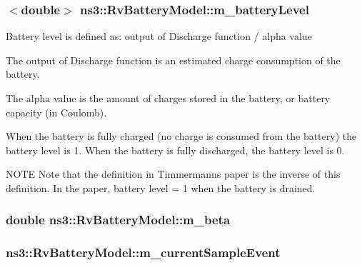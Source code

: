 \subsubsection[{\texorpdfstring{m\+\_\+battery\+Level}{m_batteryLevel}}]{$<$double$>$ ns3\+::\+Rv\+Battery\+Model\+::m\+\_\+battery\+Level\hspace{0.3cm}{\ttfamily [private]}}\hypertarget{classns3_1_1RvBatteryModel_af8c48353c513a2279115e52927b479a0}{}\label{classns3_1_1RvBatteryModel_af8c48353c513a2279115e52927b479a0}
Battery level is defined as\+: output of Discharge function / alpha value

The output of Discharge function is an estimated charge consumption of the battery.

The alpha value is the amount of charges stored in the battery, or battery capacity (in Coulomb).

When the battery is fully charged (no charge is consumed from the battery) the battery level is 1. When the battery is fully discharged, the battery level is 0.

N\+O\+TE Note that the definition in Timmermann\textquotesingle{}s paper is the inverse of this definition. In the paper, battery level = 1 when the battery is drained. 
\subsubsection[{\texorpdfstring{m\+\_\+beta}{m_beta}}]{\setlength{\rightskip}{0pt plus 5cm}double ns3\+::\+Rv\+Battery\+Model\+::m\+\_\+beta\hspace{0.3cm}{\ttfamily [private]}}\hypertarget{classns3_1_1RvBatteryModel_afd9fb778ecbaf556b125e4a557baba86}{}\label{classns3_1_1RvBatteryModel_afd9fb778ecbaf556b125e4a557baba86}
\subsubsection[{\texorpdfstring{m\+\_\+current\+Sample\+Event}{m_currentSampleEvent}}]{ ns3\+::\+Rv\+Battery\+Model\+::m\+\_\+current\+Sample\+Event\hspace{0.3cm}{\ttfamily [private]}}\hypertarget{classns3_1_1RvBatteryModel_a3eb7ced1023c82a8a4714d46e8a97342}{}\label{classns3_1_1RvBatteryModel_a3eb7ced1023c82a8a4714d46e8a97342}
